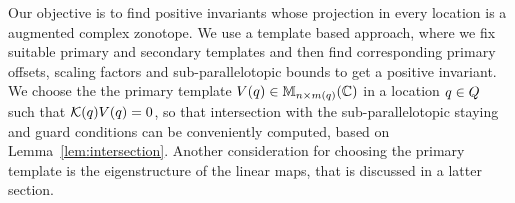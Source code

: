 
Our objective is to find positive invariants whose projection in every
location is a augmented complex zonotope.  We use a template based
approach, where we fix suitable primary and secondary templates and
then find corresponding primary offsets, scaling factors and
sub-parallelotopic bounds to get a positive invariant.  We choose the
the primary template $V(q)\in\mathbb{M}_{n\times m(q)}(\mathbb{\mathbb{C}})$ in a
location $q\in Q$ such
that
$\mathcal{K}(q)V(q) = 0$,
so that intersection with the sub-parallelotopic staying and guard
conditions can be conveniently computed, based on
Lemma~\ref{lem:intersection}.  Another consideration for choosing the
primary template is the eigenstructure of the linear
maps, that is discussed in a latter section.


